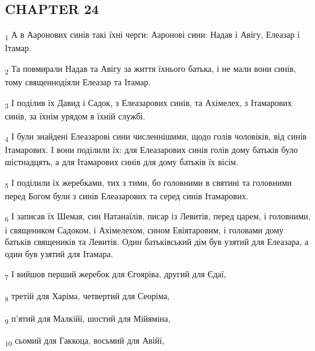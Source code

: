 \subsection{CHAPTER 24}
\begin{tcolorbox}
\textsubscript{1} А в Ааронових синів такі їхні черги: Ааронові сини: Надав і Авігу, Елеазар і Ітамар.
\end{tcolorbox}
\begin{tcolorbox}
\textsubscript{2} Та повмирали Надав та Авігу за життя їхнього батька, і не мали вони синів, тому священнодіяли Елеазар та Ітамар.
\end{tcolorbox}
\begin{tcolorbox}
\textsubscript{3} І поділив їх Давид і Садок, з Елеазарових синів, та Ахімелех, з Ітамарових синів, за їхнім урядом в їхній службі.
\end{tcolorbox}
\begin{tcolorbox}
\textsubscript{4} І були знайдені Елеазарові сини численнішими, щодо голів чоловіків, від синів Ітамарових. І вони поділили їх: для Елеазарових синів голів дому батьків було шістнадцять, а для Ітамарових синів для дому батьків їх вісім.
\end{tcolorbox}
\begin{tcolorbox}
\textsubscript{5} І поділили їх жеребками, тих з тими, бо головними в святині та головними перед Богом були з синів Елеазарових та серед синів Ітамарових.
\end{tcolorbox}
\begin{tcolorbox}
\textsubscript{6} І записав їх Шемая, син Натанаїлів, писар із Левитів, перед царем, і головними, і священиком Садоком, і Ахімелехом, сином Евіятаровим, і головами дому батьків священиків та Левитів. Один батьківський дім був узятий для Елеазара, а один був узятий для Ітамара.
\end{tcolorbox}
\begin{tcolorbox}
\textsubscript{7} І вийшов перший жеребок для Єгояріва, другий для Єдаї,
\end{tcolorbox}
\begin{tcolorbox}
\textsubscript{8} третій для Харіма, четвертий для Сеоріма,
\end{tcolorbox}
\begin{tcolorbox}
\textsubscript{9} п'ятий для Малкійї, шостий для Мійяміна,
\end{tcolorbox}
\begin{tcolorbox}
\textsubscript{10} сьомий для Гаккоца, восьмий для Авійї,
\end{tcolorbox}
